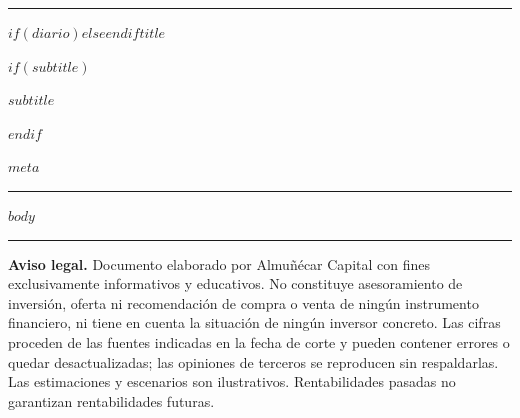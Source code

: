 \documentclass[10pt,a4paper]{article}
\newcommand{\acword}[1]{{\color{corp}\fontsize{#1}{#1}\selectfont\aclogofont ALMUÑÉCAR\ \ CAPITAL}}
\begin{document}
\thispagestyle{first}
\noindent\acsymbol[1.15]\hspace{2.5mm}\raisebox{2.2mm}{\acword{11}}\hfill{}\par\vspace{4pt}
{\color{corp}\rule{\linewidth}{0.8pt}}\par\vspace{12pt}
{$if(diario)$\fontsize{17}{21}$else$\fontsize{22}{27}$endif$\selectfont\bfseries\color{corp}$title$\par}\vspace{4pt}
$if(subtitle)${\large\lightfont\color{ink}$subtitle$\par}\vspace{6pt}$endif$
{\small\color{muted}$meta$\par}\vspace{6pt}
{\color{rule}\rule{\linewidth}{0.4pt}}\par\vspace{4pt}
$body$
\vspace{14pt}
{\color{rule}\rule{\linewidth}{0.4pt}}\par
{\scriptsize\color{muted}\textbf{Aviso legal.} Documento elaborado por Almuñécar Capital con fines exclusivamente informativos y educativos. No constituye asesoramiento de inversión, oferta ni recomendación de compra o venta de ningún instrumento financiero, ni tiene en cuenta la situación de ningún inversor concreto. Las cifras proceden de las fuentes indicadas en la fecha de corte y pueden contener errores o quedar desactualizadas; las opiniones de terceros se reproducen sin respaldarlas. Las estimaciones y escenarios son ilustrativos. Rentabilidades pasadas no garantizan rentabilidades futuras.\par}
\end{document}
